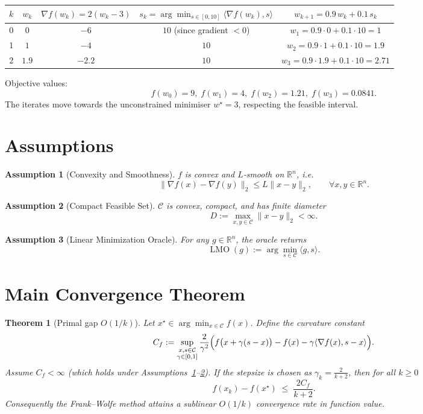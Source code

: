 \documentclass{article}
\newtheorem{theorem}{Theorem}[section]
\newtheorem{assumption}{Assumption}[section]
\begin{document}
\begin{center}
\begin{tabular}{c|c|c|c|c}
$k$ & $w_k$ & $\nabla f(w_k)=2(w_k-3)$ & $s_k=\arg\min_{s\in[0,10]}\langle\nabla f(w_k),s\rangle$ & $w_{k+1}=0.9\,w_k+0.1\,s_k$\\ \hline
0 & $0$ & $-6$ & $10$ (since gradient $<0$) & $w_1=0.9\cdot0+0.1\cdot10=1$\\
1 & $1$ & $-4$ & $10$ & $w_2=0.9\cdot1+0.1\cdot10=1.9$\\
2 & $1.9$ & $-2.2$ & $10$ & $w_3=0.9\cdot1.9+0.1\cdot10=2.71$
\end{tabular}
\end{center}

Objective values:
\[
f(w_0)=9,\; f(w_1)=4,\; f(w_2)=1.21,\; f(w_3)=0.0841.
\]
The iterates move towards the unconstrained minimiser $w^\star=3$, respecting the feasible interval.

\newpage
\section*{Assumptions}
\begin{assumption}[Convexity and Smoothness]\label{as:convex-smooth}
$f$ is convex and $L$‑smooth on $\mathbb{R}^n$, i.e.
\[
\|\nabla f(x)-\nabla f(y)\|_2\le L\|x-y\|_2,\qquad\forall x,y\in\mathbb{R}^n .
\]
\end{assumption}

\begin{assumption}[Compact Feasible Set]\label{as:compact}
$\mathcal{C}$ is convex, compact, and has finite diameter
\[
D:=\max_{x,y\in\mathcal{C}}\|x-y\|_2 <\infty .
\]
\end{assumption}

\begin{assumption}[Linear Minimization Oracle]\label{as:oracle}
For any $g\in\mathbb{R}^n$, the oracle returns
\[
\operatorname{LMO}(g):=\arg\min_{s\in\mathcal{C}}\langle g,s\rangle .
\]
\end{assumption}

\section*{Main Convergence Theorem}
\begin{theorem}[Primal gap $O(1/k)$]\label{thm:fw-rate}
Let $x^\star\in\arg\min_{x\in\mathcal{C}}f(x)$. Define the curvature constant
\[
C_f := \sup_{\substack{x,s\in\mathcal{C}\\ \gamma\in[0,1]}}
\frac{2}{\gamma^2}\Bigl(f\bigl(x+\gamma(s-x)\bigr)-f(x)-\gamma\langle\nabla f(x),s-x\rangle\Bigr).
\]
Assume $C_f<\infty$ (which holds under Assumptions~\ref{as:convex-smooth}–\ref{as:compact}).  
If the stepsize is chosen as $\gamma_k=\frac{2}{k+2}$, then for all $k\ge0$
\[
f(x_k)-f(x^\star)\;\le\;\frac{2C_f}{k+2}.
\]
Consequently the Frank–Wolfe method attains a sublinear $O(1/k)$ convergence rate in function value.
\end{theorem}
\end{document}
